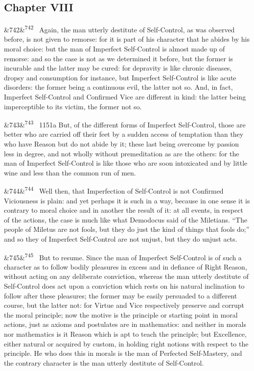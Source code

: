 \documentclass[12pt]{article}
\newcommand{\para}[1][]{\par\noindent\ifx&#1&\else\textsuperscript{\footnotesize #1}~\fi}
\begin{document}
\subsection*{Chapter VIII}

\para[742] Again, the man utterly destitute of Self-Control, as was observed before, is not given to remorse: for it is part of his character that he abides by his moral choice: but the man of Imperfect Self-Control is almost made up of remorse: and so the case is not as we determined it before, but the former is incurable and the latter may be cured: for depravity is like chronic diseases, dropsy and consumption for instance, but Imperfect Self-Control is like acute disorders: the former being a continuous evil, the latter not so. And, in fact, Imperfect Self-Control and Confirmed Vice are different in kind: the latter being imperceptible to its victim, the former not so.

\para[743] 1151a But, of the different forms of Imperfect Self-Control, those are better who are carried off their feet by a sudden access of temptation than they who have Reason but do not abide by it; these last being overcome by passion less in degree, and not wholly without premeditation as are the others: for the man of Imperfect Self-Control is like those who are soon intoxicated and by little wine and less than the common run of men.

\para[744] Well then, that Imperfection of Self-Control is not Confirmed Viciousness is plain: and yet perhaps it is such in a way, because in one sense it is contrary to moral choice and in another the result of it: at all events, in respect of the actions, the case is much like what Demodocus said of the Miletians. “The people of Miletus are not fools, but they do just the kind of things that fools do;” and so they of Imperfect Self-Control are not unjust, but they do unjust acts.

\para[745] But to resume. Since the man of Imperfect Self-Control is of such a character as to follow bodily pleasures in excess and in defiance of Right Reason, without acting on any deliberate conviction, whereas the man utterly destitute of Self-Control does act upon a conviction which rests on his natural inclination to follow after these pleasures; the former may be easily persuaded to a different course, but the latter not: for Virtue and Vice respectively preserve and corrupt the moral principle; now the motive is the principle or starting point in moral actions, just as axioms and postulates are in mathematics: and neither in morals nor mathematics is it Reason which is apt to teach the principle; but Excellence, either natural or acquired by custom, in holding right notions with respect to the principle. He who does this in morals is the man of Perfected Self-Mastery, and the contrary character is the man utterly destitute of Self-Control.
\end{document}
